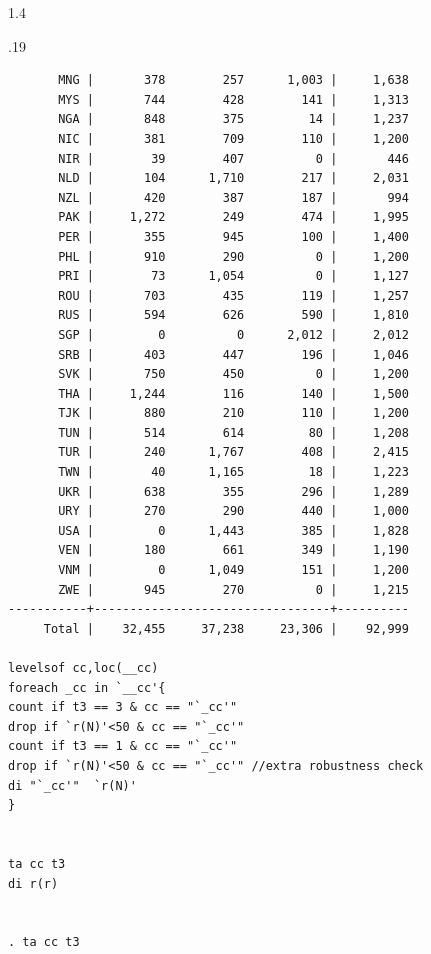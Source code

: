 \documentclass[10pt, letterpaper]{article}
\begin{document}
\begin{spacing}{1.4}
\begin{scriptsize}
\begin{spacing}{.19}
\begin{verbatim}
       MNG |       378        257      1,003 |     1,638 
       MYS |       744        428        141 |     1,313 
       NGA |       848        375         14 |     1,237 
       NIC |       381        709        110 |     1,200 
       NIR |        39        407          0 |       446 
       NLD |       104      1,710        217 |     2,031 
       NZL |       420        387        187 |       994 
       PAK |     1,272        249        474 |     1,995 
       PER |       355        945        100 |     1,400 
       PHL |       910        290          0 |     1,200 
       PRI |        73      1,054          0 |     1,127 
       ROU |       703        435        119 |     1,257 
       RUS |       594        626        590 |     1,810 
       SGP |         0          0      2,012 |     2,012 
       SRB |       403        447        196 |     1,046 
       SVK |       750        450          0 |     1,200 
       THA |     1,244        116        140 |     1,500 
       TJK |       880        210        110 |     1,200 
       TUN |       514        614         80 |     1,208 
       TUR |       240      1,767        408 |     2,415 
       TWN |        40      1,165         18 |     1,223 
       UKR |       638        355        296 |     1,289 
       URY |       270        290        440 |     1,000 
       USA |         0      1,443        385 |     1,828 
       VEN |       180        661        349 |     1,190 
       VNM |         0      1,049        151 |     1,200 
       ZWE |       945        270          0 |     1,215 
-----------+---------------------------------+----------
     Total |    32,455     37,238     23,306 |    92,999 

levelsof cc,loc(__cc)
foreach _cc in `__cc'{
count if t3 == 3 & cc == "`_cc'"
drop if `r(N)'<50 & cc == "`_cc'"
count if t3 == 1 & cc == "`_cc'" 
drop if `r(N)'<50 & cc == "`_cc'" //extra robustness check 
di "`_cc'"  `r(N)'
} 


ta cc t3
di r(r)


. ta cc t3


\end{verbatim}
\end{spacing}
\end{scriptsize}
\end{spacing}
\end{document}
